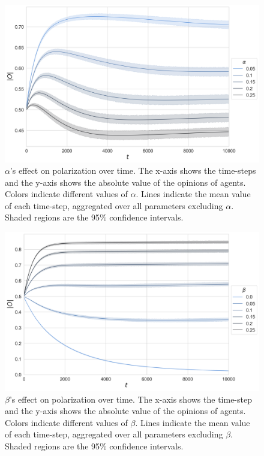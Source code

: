 \documentclass[11pt]{article}
\begin{document}
\begin{figure}[H]
    \centering
    \includegraphics[width=.7\linewidth]{../plots/overall/Absolute_Opinion_Positive_Learning_Rate.png}
  \caption{$\alpha$'s effect on polarization over time. The x-axis shows the time-steps and the y-axis shows the absolute value of the opinions of agents. Colors indicate different values of $\alpha$. Lines indicate the mean value of each time-step, aggregated over all parameters excluding $\alpha$. Shaded regions are the 95\% confidence intervals.}
  \label{appendix:alpha}
\end{figure}

\begin{figure}[H]
    \centering
    \includegraphics[width=.7\linewidth]{../plots/overall/Absolute_Opinion_Negative_Learning_Rate.png}
  \caption{$\beta$'s effect on polarization over time. The x-axis shows the time-step and the y-axis shows the absolute value of the opinions of agents. Colors indicate different values of $\beta$. Lines indicate the mean value of each time-step, aggregated over all parameters excluding $\beta$. Shaded regions are the 95\% confidence intervals.}
  \label{appendix:beta}
\end{figure}
\end{document}
